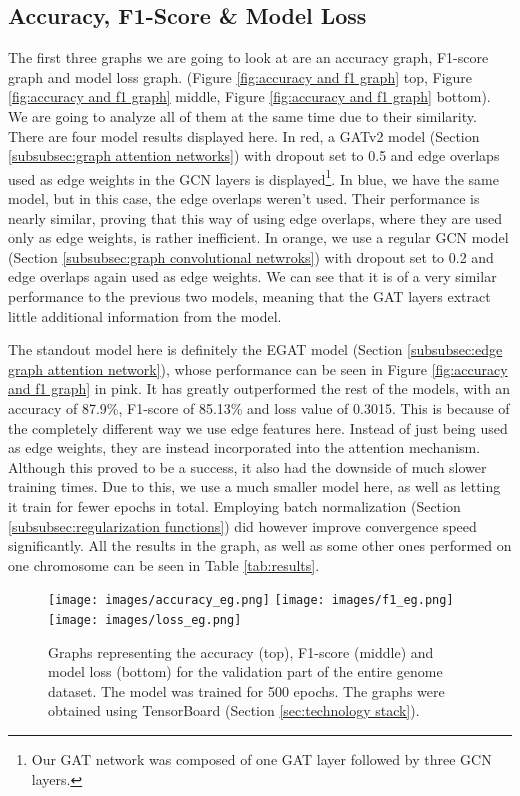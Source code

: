 \documentclass[times, utf8, diplomski, english]{fer_eng}
\begin{document}
\subsection{Accuracy, F1-Score \& Model Loss}

The first three graphs we are going to look at are an accuracy graph, F1-score graph and model loss graph. (Figure \ref{fig:accuracy and f1 graph} top, Figure \ref{fig:accuracy and f1 graph} middle, Figure \ref{fig:accuracy and f1 graph} bottom). We are going to analyze all of them at the same time due to their similarity. There are four model results displayed here. In red, a GATv2 model (Section \ref{subsubsec:graph attention networks}) with dropout set to 0.5 and edge overlaps used as edge weights in the GCN layers is displayed\footnote{Our GAT network was composed of one GAT layer followed by three GCN layers.}. In blue, we have the same model, but in this case, the edge overlaps weren't used. Their performance is nearly similar, proving that this way of using edge overlaps, where they are used only as edge weights, is rather inefficient. In orange, we use a regular GCN model (Section \ref{subsubsec:graph convolutional netwroks}) with dropout set to 0.2 and edge overlaps again used as edge weights. We can see that it is of a very similar performance to the previous two models, meaning that the GAT layers extract little additional information from the model.

The standout model here is definitely the EGAT model (Section \ref{subsubsec:edge graph attention network}), whose performance can be seen in Figure \ref{fig:accuracy and f1 graph} in pink. It has greatly outperformed the rest of the models, with an accuracy of 87.9\%, F1-score of 85.13\% and loss value of 0.3015. This is because of the completely different way we use edge features here. Instead of just being used as edge weights, they are instead incorporated into the attention mechanism. Although this proved to be a success, it also had the downside of much slower training times. Due to this, we use a much smaller model here, as well as letting it train for fewer epochs in total. Employing batch normalization (Section \ref{subsubsec:regularization functions}) did however improve convergence speed significantly. All the results in the graph, as well as some other ones performed on one chromosome can be seen in Table \ref{tab:results}.

\begin{figure}[h!]
	\centering
	\texttt{[image: images/accuracy\_eg.png]}
	\texttt{[image: images/f1\_eg.png]}
	\texttt{[image: images/loss\_eg.png]}
	\caption[Accuracy,f1-score and loss graph for the entire genome dataset]{Graphs representing the accuracy (top), F1-score (middle) and model loss (bottom) for the validation part of the entire genome dataset. The model was trained for 500 epochs. The graphs were obtained using TensorBoard (Section \ref{sec:technology stack}).}
	\label{fig:accuracy, f1 score and loss}
\end{figure}
\end{document}
